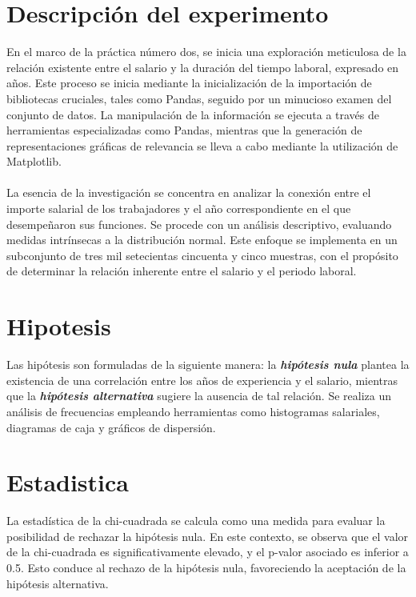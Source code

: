 \documentclass{article}
\begin{document}
\section{Descripción del experimento}
En el marco de la práctica número dos, se inicia una exploración meticulosa de la relación existente entre el salario y la duración del tiempo laboral, expresado en años. Este proceso se inicia mediante la inicialización de la importación de bibliotecas cruciales, tales como Pandas, seguido por un minucioso examen del conjunto de datos. La manipulación de la información se ejecuta a través de herramientas especializadas como Pandas, mientras que la generación de representaciones gráficas de relevancia se lleva a cabo mediante la utilización de Matplotlib.
\\\\
La esencia de la investigación se concentra en analizar la conexión entre el importe salarial de los trabajadores y el año correspondiente en el que desempeñaron sus funciones. Se procede con un análisis descriptivo, evaluando medidas intrínsecas a la distribución normal. Este enfoque se implementa en un subconjunto de tres mil setecientas cincuenta y cinco muestras, con el propósito de determinar la relación inherente entre el salario y el periodo laboral.

\section{Hipotesis}
Las hipótesis son formuladas de la siguiente manera: la \textbf{\textit{hipótesis nula}} plantea la existencia de una correlación entre los años de experiencia y el salario, mientras que la \textit{\textbf{hipótesis alternativa}} sugiere la ausencia de tal relación. Se realiza un análisis de frecuencias empleando herramientas como histogramas salariales, diagramas de caja y gráficos de dispersión.

\section{Estadistica}
La estadística de la chi-cuadrada se calcula como una medida para evaluar la posibilidad de rechazar la hipótesis nula. En este contexto, se observa que el valor de la chi-cuadrada es significativamente elevado, y el p-valor asociado es inferior a 0.5. Esto conduce al rechazo de la hipótesis nula, favoreciendo la aceptación de la hipótesis alternativa.
\end{document}
